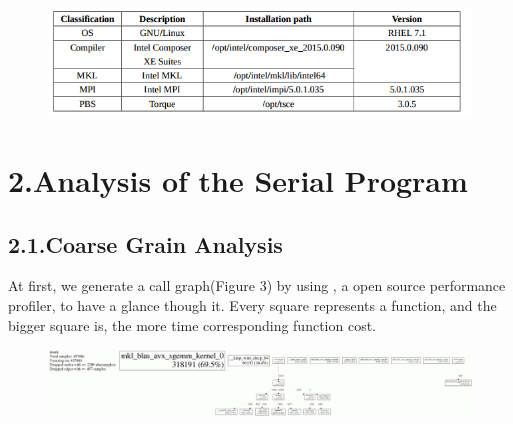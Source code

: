 \documentclass{article}
\begin{document}
\begin{figure}[tbp]%
\begin{mdcenter}%

\noindent{}\includegraphics[keepaspectratio=true,width=\dimmin{}{\dimwidth{0.90}}]{images/2016-02-18-23-13-11-}{}%

\mdhr{}%

\noindent{}%
\end{mdcenter}\label{fig-myfigure}%
\end{figure}%

\section{2.\hspace*{0.5em}Analysis of the Serial Program}\label{sec-analysis-of-the-serial-program}%

\subsection{2.1.\hspace*{0.5em}Coarse Grain Analysis}\label{sec-coarse-grain-analysis}%

\noindent{}At first, we generate a call graph(Figure 3) by using , a open source performance profiler, to have a glance though it. Every square represents a function, and the bigger square is, the more time corresponding function cost.%

\begin{figure}[tbp]%
\begin{mdcenter}%

\noindent{}\includegraphics[keepaspectratio=true,width=\dimmin{}{\dimwidth{0.90}}]{images/100001994364201}{}%

\mdhr{}%

\noindent{}%
\end{mdcenter}\label{fig-myfigure}%
\end{figure}%
\end{document}
